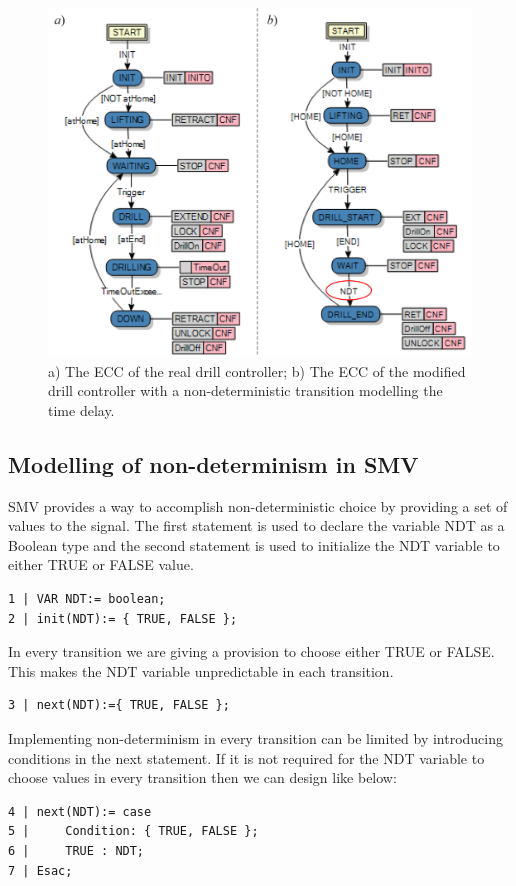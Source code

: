 \begin{bibunit}
\begin{figure}
    \centering
    \includegraphics[scale = 0.24]{MX_Papers/Paper2/images/Fig10.png}
    \caption{ a) The ECC of the real drill controller; b) The ECC of the modified drill controller with a non-deterministic transition modelling the time delay.}
    \label{figure:DrillECCControllers}
\end{figure}


\subsection{Modelling of non-determinism in SMV}\label{sec:NDTinSMV}



SMV provides a way to accomplish non-deterministic choice by providing a set of values to the signal. The first statement is used to  declare the variable NDT as a Boolean type and the second statement is used to initialize the NDT variable to either TRUE or FALSE value.

\begin{lstlisting}[breaklines,basicstyle=\small]
1 | VAR NDT:= boolean;
2 | init(NDT):= { TRUE, FALSE };
\end{lstlisting}
 In every  transition we are giving a provision to choose either TRUE or FALSE. This makes the NDT variable unpredictable in each transition.
\begin{lstlisting}[breaklines,basicstyle=\small]
3 | next(NDT):={ TRUE, FALSE };
\end{lstlisting}
Implementing non-determinism in every transition can be limited by introducing conditions in the next statement. If it is not required for the NDT variable to choose values in every transition then we can design like below:
\begin{lstlisting}[breaklines,basicstyle=\small]
4 | next(NDT):= case
5 | 	Condition: { TRUE, FALSE };
6 |     TRUE : NDT;
7 | Esac;


\end{lstlisting}
\end{bibunit}

